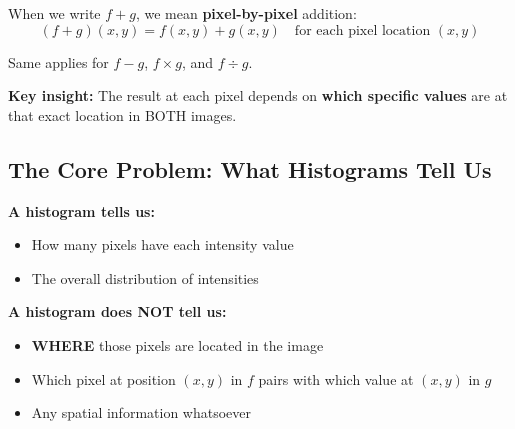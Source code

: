 \documentclass[12pt,a4paper]{article}
\begin{document}
\begin{conceptbox}
When we write $f + g$, we mean \textbf{pixel-by-pixel} addition:
\[
(f+g)(x,y) = f(x,y) + g(x,y) \quad \text{for each pixel location } (x,y)
\]

Same applies for $f-g$, $f \times g$, and $f \div g$.

\textbf{Key insight:} The result at each pixel depends on \textbf{which specific values} are at that exact location in BOTH images.
\end{conceptbox}

\subsection{The Core Problem: What Histograms Tell Us}

\begin{conceptbox}
\textbf{A histogram tells us:}
\begin{itemize}
    \item How many pixels have each intensity value
    \item The overall distribution of intensities
\end{itemize}

\textbf{A histogram does NOT tell us:}
\begin{itemize}
    \item \textbf{WHERE} those pixels are located in the image
    \item Which pixel at position $(x,y)$ in $f$ pairs with which value at $(x,y)$ in $g$
    \item Any spatial information whatsoever
\end{itemize}
\end{conceptbox}
\end{document}
